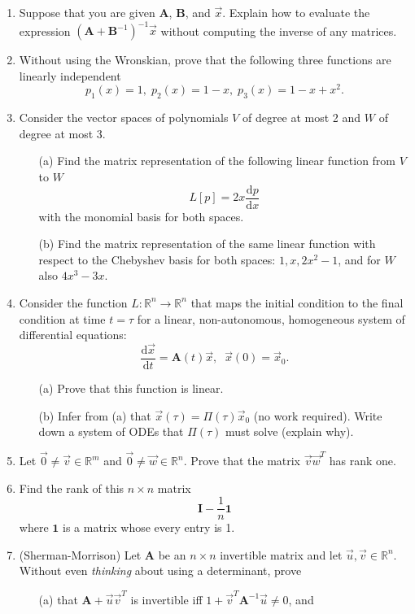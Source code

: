 \documentclass[11pt,fleqn]{article}
\newcommand{\mat}[1]{\mathbf{#1}}
\begin{document}
\begin{enumerate}
\item Suppose that you are given $\mat{A}$, $\mat{B}$, and $\vec{x}$. Explain how to evaluate the expression $(\mathbf{A}+\mathbf{B}^{-1})^{-1}\vec{x}$ without computing the inverse of any matrices.
\item Without using the Wronskian, prove that the following three functions are linearly independent
\[p_1(x) = 1,\;p_2(x) = 1 - x,\;p_3(x) = 1 - x + x^2.\]
\item Consider the vector spaces of polynomials $V$ of degree at most 2 and $W$ of degree at most 3. 
	\begin{itemize}
	\item[(a)] Find the matrix representation of the following linear function from $V$ to $W$
	\[L[p] = 2x\frac{\mathrm{d}p}{\mathrm{d}x}\]
	with the monomial basis for both spaces.
	\item[(b)] Find the matrix representation of the same linear function with respect to the Chebyshev basis for both spaces: $1, x, 2x^2 - 1$, and for $W$ also $4x^3-3x$.
	\end{itemize}
\item Consider the function $L:\mathbb{R}^n\to\mathbb{R}^n$ that maps the initial condition to the final condition at time $t=\tau$ for a linear, non-autonomous, homogeneous system of differential equations:
\[\frac{\mathrm{d}\vec{x}}{\mathrm{d}t} = \mathbf{A}(t)\vec{x},\;\;\vec{x}(0) = \vec{x}_0.\]
	\begin{itemize}
	\item[(a)] Prove that this function is linear.
	\item[(b)] Infer from (a) that $\vec{x}(\tau) = \Pi(\tau)\vec{x}_0$ (no work required). Write down a system of ODEs that $\Pi(\tau)$ must solve (explain why).
	\end{itemize}
\item Let $\vec{0}\neq \vec{v}\in\mathbb{R}^m$ and $\vec{0}\neq\vec{w}\in\mathbb{R}^n$. Prove that the matrix $\vec{v}\vec{w}^T$ has rank one.
\item Find the rank of this $n\times n$ matrix
\[\mathbf{I} - \frac{1}{n}\mathbf{1}\]
where $\mathbf{1}$ is a matrix whose every entry is 1.
\item (Sherman-Morrison) Let $\mathbf{A}$ be an $n\times n$ invertible matrix and let $\vec{u},\vec{v}\in\mathbb{R}^n$. Without even {\it thinking} about using a determinant, prove
	\begin{itemize}
	\item[(a)] that $\mathbf{A}+\vec{u}\vec{v}^T$ is invertible iff $1+\vec{v}^T\mathbf{A}^{-1}\vec{u}\neq0$, and

\end{itemize}
\end{enumerate}
\end{document}
